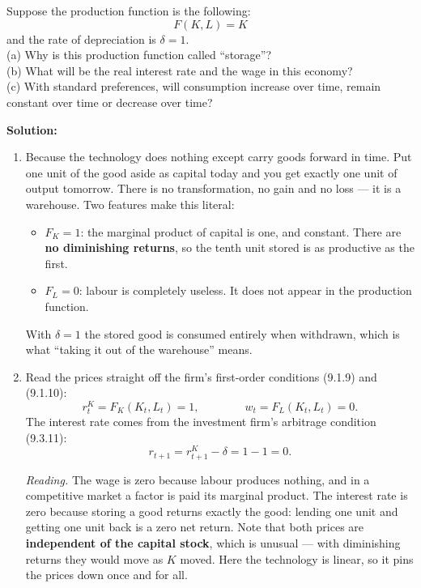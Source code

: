 \documentclass[12pt, letterpaper]{article}
\begin{document}
\begin{tcolorbox}[evenbox,title={Problem 9.2 \quad Storage}]
\begin{tcolorbox}[questionbox]
Suppose the production function is the following:
\[F(K,L)=K\]
and the rate of depreciation is $\delta=1$.\\[3pt]
(a) Why is this production function called ``storage''?\\
(b) What will be the real interest rate and the wage in this economy?\\
(c) With standard preferences, will consumption increase over time, remain constant over
time or decrease over time?
\end{tcolorbox}

\textbf{Solution:}

\begin{enumerate}
\item Because the technology does nothing except carry goods forward in time. Put one unit
of the good aside as capital today and you get exactly one unit of output tomorrow. There
is no transformation, no gain and no loss --- it is a warehouse. Two features make this
literal:
\begin{itemize}
\item $F_K=1$: the marginal product of capital is one, and constant. There are
\textbf{no diminishing returns}, so the tenth unit stored is as productive as the first.
\item $F_L=0$: labour is completely useless. It does not appear in the production function.
\end{itemize}
With $\delta=1$ the stored good is consumed entirely when withdrawn, which is what
``taking it out of the warehouse'' means.

\item Read the prices straight off the firm's first-order conditions (9.1.9) and (9.1.10):
\[
r^K_t=F_K(K_t,L_t)=1,\qquad\qquad w_t=F_L(K_t,L_t)=\boxed{0}.
\]
The interest rate comes from the investment firm's arbitrage condition (9.3.11):
\[
r_{t+1}=r^K_{t+1}-\delta=1-1=\boxed{0}.
\]

\emph{Reading.} The wage is zero because labour produces nothing, and in a competitive
market a factor is paid its marginal product. The interest rate is zero because storing a
good returns exactly the good: lending one unit and getting one unit back is a zero net
return. Note that both prices are \textbf{independent of the capital stock}, which is
unusual --- with diminishing returns they would move as $K$ moved. Here the technology is
linear, so it pins the prices down once and for all.


\end{enumerate}
\end{tcolorbox}
\end{document}
